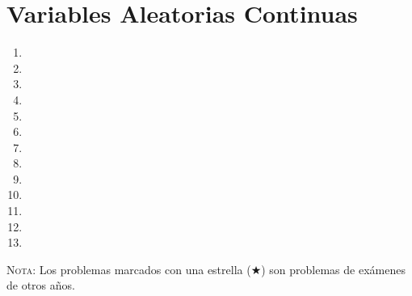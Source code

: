 \documentclass[a4paper,titlepage]{article}
\begin{document}
\section{Variables Aleatorias Continuas}
\begin{enumerate}[leftmargin=*,resume]
\item {}
\item {}
\item {}
\item {}
\item {}
\item {}
\item {}
\item {}
\item {}
\item {}
\item {}
\item {}
\item {}
\end{enumerate}
\vspace{2cm}

\textsc{Nota}: Los problemas marcados con una estrella ($\bigstar$) son problemas de
exámenes de otros años.
\end{document}
